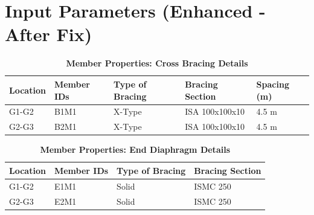 \documentclass[12pt,a4paper]{report}
\begin{document}
\chapter{Input Parameters (Enhanced - After Fix)}

\setlength\LTleft{0pt}
\setlength\LTright{\fill}

\begin{longtable}{|L{2.2cm}|L{2.2cm}|L{3.0cm}|L{4.0cm}|C{2.0cm}|}
\caption{\textbf{Member Properties: Cross Bracing Details}}\\
\hline
\textbf{Location} & \textbf{Member IDs} & \textbf{Type of Bracing} & \textbf{Bracing Section} & \textbf{Spacing (m)} \\
\hline
G1-G2 & B1M1 & X-Type & ISA 100x100x10 & 4.5 m \\[6pt]
\hline
G2-G3 & B2M1 & X-Type & ISA 100x100x10 & 4.5 m \\[6pt]
\hline
\end{longtable}

\vspace{0.8em}
\setlength\LTleft{0pt}
\setlength\LTright{\fill}

\begin{longtable}{|L{2.2cm}|L{2.2cm}|L{3.0cm}|L{6.0cm}|}
\caption{\textbf{Member Properties: End Diaphragm Details}}\\
\hline
\textbf{Location} & \textbf{Member IDs} & \textbf{Type of Bracing} & \textbf{Bracing Section} \\
\hline
G1-G2 & E1M1 & Solid & ISMC 250 \\[6pt]
\hline
G2-G3 & E2M1 & Solid & ISMC 250 \\[6pt]
\hline
\end{longtable}
\end{document}

